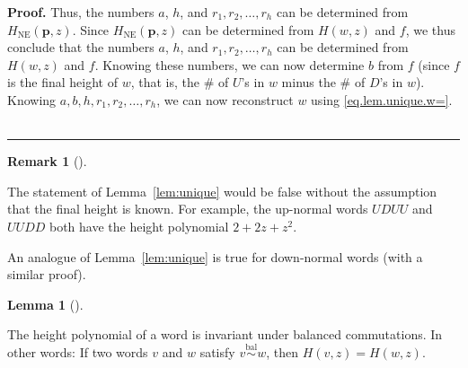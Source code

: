 \documentclass[numbers=enddot,12pt,final,onecolumn,notitlepage]{scrartcl}%
\theoremstyle{definition}
\newtheorem{lem}[theo]{Lemma}
\newenvironment{lemma}[1][]
{\begin{lem}[#1]\begin{leftbar}}
{\end{leftbar}\end{lem}}
\newtheorem{remk}[theo]{Remark}
\newenvironment{remark}[1][]
{\begin{remk}[#1]\begin{leftbar}}
{\end{leftbar}\end{remk}}
\newenvironment{proof}[1][Proof]{\noindent\textbf{#1.} }{\ \rule{0.5em}{0.5em}}
\newcommand{\pp}{\mathbf{p}}
\newcommand{\NE}{\operatorname{NE}}
\newcommand{\balsim}{\overset{\operatorname*{bal}}{\sim}}
\newcommand{\tup}[1]{\left( #1 \right)}
\begin{document}
\begin{proof}
Thus, the numbers $a$, $h$, and $r_1,r_2,\ldots,r_h$ can be determined from $H_{\NE}(\pp,z)$.
Since $H_{\NE}(\pp,z)$ can be determined from $H\tup{w,z}$ and $f$,
we thus conclude that the numbers $a$, $h$, and $r_1,r_2,\ldots,r_h$ can be determined from $H\tup{w,z}$ and $f$.
Knowing these numbers, we can now determine $b$ from $f$ (since $f$ is the final height of $w$, that is, the \# of $U$'s in $w$ minus the \# of $D$'s in $w$).
Knowing $a, b, h, r_1, r_2, \ldots, r_h$, we can now reconstruct $w$ using \eqref{eq.lem.unique.w=}.
\end{proof}

\begin{remark}
The statement of Lemma~\ref{lem:unique} would be false without the assumption that the final height is known. For example, the up-normal words $UDUU$ and $UUDD$ both have the height polynomial $2+2z+z^2$.
\end{remark}

An analogue of Lemma~\ref{lem:unique} is true for down-normal words (with a similar proof).

\begin{lemma} \label{lem:invariant}
The height polynomial of a word is invariant under balanced commutations.
In other words: If two words $v$ and $w$ satisfy $v \balsim w$, then $H(v,z) = H(w,z)$.
\end{lemma}
\end{document}
